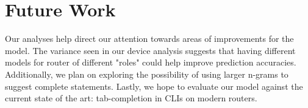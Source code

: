 \section{Future Work}

Our analyses help direct our attention towards areas of improvements for the model. The variance seen in our device analysis suggests that having different models for router of different "roles" could help improve prediction accuracies. Additionally, we plan on exploring the possibility of using larger n-grams to suggest complete statements. Lastly, we hope to evaluate our model against the current state of the art: tab-completion in CLIs on modern routers.
